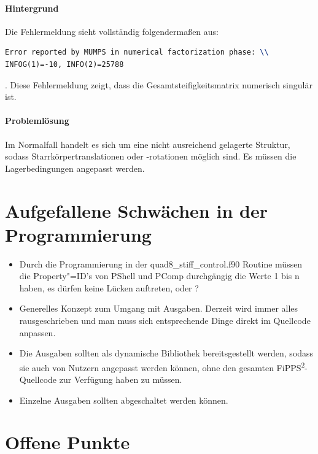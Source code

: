 \documentclass[11pt,titlepage,listof=totoc,bibliography=totoc,twoside]{scrreprt}
\begin{document}
{{\subsubsection{Hintergrund}

Die Fehlermeldung sieht vollständig folgendermaßen aus: 

\begin{lstlisting}[language=TeX,columns=fullflexible,basicstyle=\ttfamily,caption={Fehlermeldung für INFOG(1)=-10}]
Error reported by MUMPS in numerical factorization phase: \\
INFOG(1)=-10, INFO(2)=25788
\end{lstlisting}

. Diese Fehlermeldung zeigt, dass die Gesamtsteifigkeitsmatrix numerisch singulär ist.

\subsubsection{Problemlösung}

Im Normalfall handelt es sich um eine nicht ausreichend gelagerte Struktur, sodass Starrkörpertranslationen oder -rotationen möglich sind. Es müssen die Lagerbedingungen angepasst werden.


\chapter{Aufgefallene Schwächen in der Programmierung}

\begin{itemize}
\item Durch die Programmierung in der quad8\_stiff\_control.f90 Routine müssen die Property"=ID's von PShell und PComp durchgängig die Werte 1 bis n haben, es dürfen keine Lücken auftreten, oder ?
\item Generelles Konzept zum Umgang mit Ausgaben. Derzeit wird immer alles rausgeschrieben und man muss sich entsprechende Dinge direkt im Quellcode anpassen.
\item Die Ausgaben sollten als dynamische Bibliothek bereitsgestellt werden, sodass sie auch von Nutzern angepasst werden können, ohne den gesamten FiPPS\textsuperscript{2}-Quellcode zur Verfügung haben zu müssen.
\item Einzelne Ausgaben sollten abgeschaltet werden können.
\end{itemize}

\chapter{Offene Punkte}

}}
\end{document}
